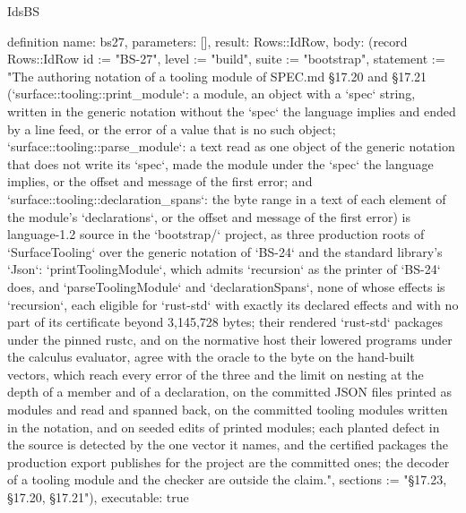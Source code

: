 \begin{lexlean}{IdsBS}
\begin{semanticmodule}
definition{
  name: bs27,
  parameters: [],
  result: Rows::IdRow,
  body: (record Rows::IdRow {id := "BS-27", level := "build", suite := "bootstrap", statement := "The authoring notation of a tooling module of SPEC.md §17.20 and §17.21 (`surface::tooling::print_module`: a module, an object with a `spec` string, written in the generic notation without the `spec` the language implies and ended by a line feed, or the error of a value that is no such object; `surface::tooling::parse_module`: a text read as one object of the generic notation that does not write its `spec`, made the module under the `spec` the language implies, or the offset and message of the first error; and `surface::tooling::declaration_spans`: the byte range in a text of each element of the module's `declarations`, or the offset and message of the first error) is language-1.2 source in the `bootstrap/` project, as three production roots of `SurfaceTooling` over the generic notation of `BS-24` and the standard library's `Json`: `printToolingModule`, which admits `recursion` as the printer of `BS-24` does, and `parseToolingModule` and `declarationSpans`, none of whose effects is `recursion`, each eligible for `rust-std` with exactly its declared effects and with no part of its certificate beyond 3,145,728 bytes; their rendered `rust-std` packages under the pinned rustc, and on the normative host their lowered programs under the calculus evaluator, agree with the oracle to the byte on the hand-built vectors, which reach every error of the three and the limit on nesting at the depth of a member and of a declaration, on the committed JSON files printed as modules and read and spanned back, on the committed tooling modules written in the notation, and on seeded edits of printed modules; each planted defect in the source is detected by the one vector it names, and the certified packages the production export publishes for the project are the committed ones; the decoder of a tooling module and the checker are outside the claim.", sections := "§17.23, §17.20, §17.21"}),
  executable: true
}


\end{semanticmodule}
\end{lexlean}
